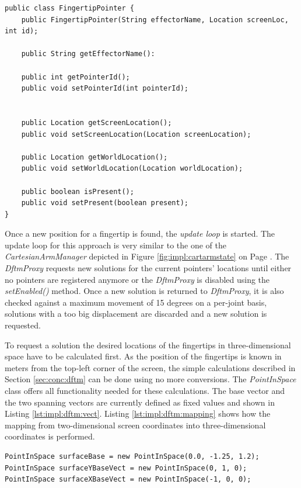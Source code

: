 \begin{lstlisting}[caption={Public interface of the FingertipPointer class},label=lst:impl:dftm:fingertip]
public class FingertipPointer {
	public FingertipPointer(String effectorName, Location screenLoc, int id);
	
	public String getEffectorName():
	
	public int getPointerId();
	public void setPointerId(int pointerId);
	
	
	public Location getScreenLocation();
	public void setScreenLocation(Location screenLocation);
	
	public Location getWorldLocation();
	public void setWorldLocation(Location worldLocation);
	
	public boolean isPresent();
	public void setPresent(boolean present);
}
\end{lstlisting}

Once a new position for a fingertip is found, the \textit{update loop} is started. The update loop for this approach is very similar to the one of the \textit{CartesianArmManager} depicted in Figure \ref{fig:impl:cartarmstate} on Page \pageref{fig:impl:cartarmstate}. The \textit{DftmProxy} requests new solutions for the current pointers' locations until either no pointers are registered anymore or the \textit{DftmProxy} is disabled using the \textit{setEnabled()} method. Once a new solution is returned to \textit{DftmProxy}, it is also checked against a maximum movement of 15 degrees on a per-joint basis, solutions with a too big displacement are discarded and a new solution is requested.

To request a solution the desired locations of the fingertips in three-dimensional space have to be calculated first. As the position of the fingertips is known in meters from the top-left corner of the screen, the simple calculations described in Section \ref{sec:conc:dftm} can be done using no more conversions. The \textit{PointInSpace} class offers all functionality needed for these calculations. The base vector and the two spanning vectors are currently defined as fixed values and shown in Listing \ref{lst:impl:dftm:vect}. Listing \ref{lst:impl:dftm:mapping} shows how the mapping from two-dimensional screen coordinates into three-dimensional coordinates is performed.

\begin{lstlisting}[caption={Vectors used for planar mapping},label=lst:impl:dftm:vect]
PointInSpace surfaceBase = new PointInSpace(0.0, -1.25, 1.2);
PointInSpace surfaceYBaseVect = new PointInSpace(0, 1, 0);
PointInSpace surfaceXBaseVect = new PointInSpace(-1, 0, 0);
\end{lstlisting}

